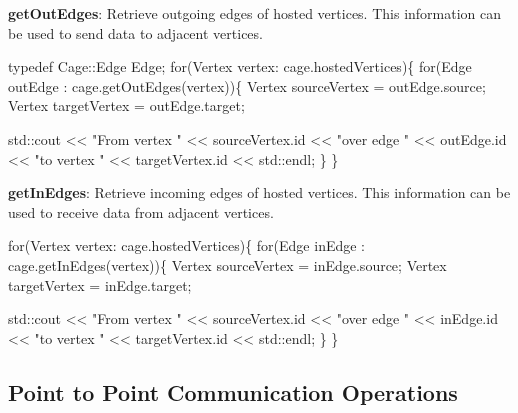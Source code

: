 \begin{DoxyEnumerate}
\item {\bfseries get\+Out\+Edges}\+: Retrieve outgoing edges of hosted vertices. This information can be used to send data to adjacent vertices. 
\begin{DoxyCode}
\textcolor{keyword}{typedef} Cage::Edge Edge;
\textcolor{keywordflow}{for}(Vertex vertex: cage.hostedVertices)\{
    \textcolor{keywordflow}{for}(Edge outEdge : cage.getOutEdges(vertex))\{
        Vertex sourceVertex = outEdge.source;
        Vertex targetVertex = outEdge.target;

        std::cout << \textcolor{stringliteral}{"From vertex "} << sourceVertex.id
                  << \textcolor{stringliteral}{"over edge "}   << outEdge.id
                  << \textcolor{stringliteral}{"to vertex "}   << targetVertex.id << std::endl;
    \}
\}
\end{DoxyCode}

\item {\bfseries get\+In\+Edges}\+: Retrieve incoming edges of hosted vertices. This information can be used to receive data from adjacent vertices. 
\begin{DoxyCode}
\textcolor{keywordflow}{for}(Vertex vertex: cage.hostedVertices)\{
    \textcolor{keywordflow}{for}(Edge inEdge : cage.getInEdges(vertex))\{
        Vertex sourceVertex = inEdge.source;
        Vertex targetVertex = inEdge.target;

        std::cout << \textcolor{stringliteral}{"From vertex "} << sourceVertex.id
                  << \textcolor{stringliteral}{"over edge "}   << inEdge.id
                  << \textcolor{stringliteral}{"to vertex "}   << targetVertex.id << std::endl;
    \}
\}
\end{DoxyCode}

\end{DoxyEnumerate}

\subsection*{Point to Point Communication Operations}


